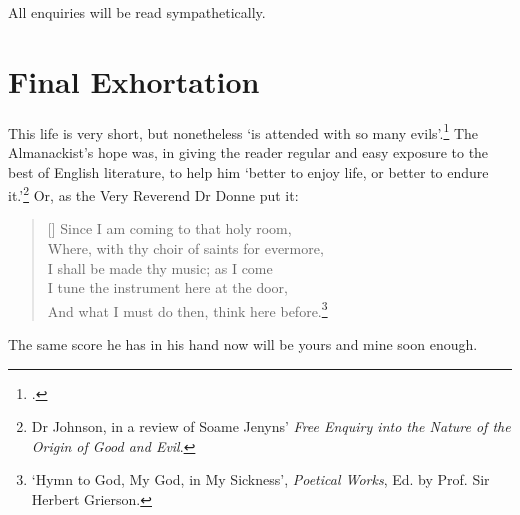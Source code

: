 \documentclass[0main.tex]{subfiles}
\begin{document}
All enquiries will be read sympathetically.

\bigskip

\section{Final Exhortation}

This life is very short, but nonetheless `is attended with so many evils'.\footnote{\cite{bunyan}.} The Almanackist's hope was, in giving the reader regular and easy exposure to the best of English literature, to help him `better to enjoy life, or better to endure it.'\footnote{Dr Johnson, in a review of Soame Jenyns' \emph{Free Enquiry into the Nature of the Origin of Good and Evil}.} Or, as the Very Reverend Dr Donne put it:

\bigskip

\settowidth{\versewidth}{\footnotesize Since I am coming to that holy room,}
\begin{verse}[\versewidth]
{\footnotesize
Since I am coming to that holy room,\\
\vin Where, with thy choir of saints for evermore,\\
I shall be made thy music; as I come\\
\vin I tune the instrument here at the door,\\
\vin And what I must do then, think here before.\footnote{`Hymn to God, My God, in My Sickness', \emph{Poetical Works}, Ed. by Prof. Sir Herbert Grierson.}\\}
\end{verse}

\bigskip

The same score he has in his hand now will be yours and mine soon enough.
\end{document}
